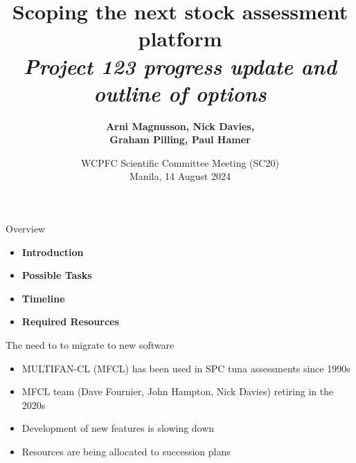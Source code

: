 \documentclass[aspectratio=169,fleqn]{beamer}
\begin{document}
\begin{frame}
  \title{\vspace{-5ex}\darkblue Scoping the next stock assessment
    platform\\[2ex]
    \it\large\darkgray
    Project 123 progress update and outline of options}
  \author{\vspace{-10ex}\darkgray\bf
    Arni Magnusson, Nick Davies,\\[0.5ex]
    Graham Pilling, Paul Hamer}
  \date{\darkgreen WCPFC Scientific Committee Meeting (SC20)\\[0.5ex]
    Manila, 14 August 2024}
  \titlepage
\end{frame}


\begin{frame}{Overview}
  \begin{itemize}
    \item[] {\bf\darkblue Introduction} \\[5ex]
    \item[] {\bf\darkblue Possible Tasks} \\[5ex]
    \item[] {\bf\darkblue Timeline} \\[5ex]
    \item[] {\bf\darkblue Required Resources} \\[1ex]
  \end{itemize}
\end{frame}


\begin{frame}{The need to to migrate to new software}
  \begin{itemize}
    \item[] MULTIFAN-CL (MFCL) has been used in SPC tuna assessments since
    1990s\\[4ex]
    \item[] MFCL team (Dave Fournier, John Hampton, Nick Davies) retiring in the
    2020s\\[4ex]
    \item[] Development of new features is slowing down\\[4ex]
    \item[] Resources are being allocated to succession plans\\[4ex]
  \end{itemize}
\end{frame}
\end{document}
